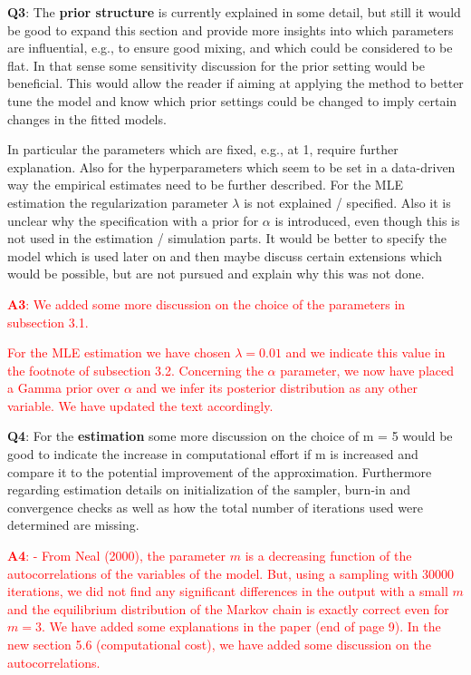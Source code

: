 \documentclass[]{article}
\newcommand\done[1]{\textcolor{red}{#1}}
\begin{document}
	
	\vspace{3mm}
	\textbf{Q3}:
	The \textbf{prior structure} is currently explained in some detail, but still it would be good to expand this section and provide more insights into which parameters are influential, e.g., to ensure good mixing, and which could be considered to be flat. In that sense some sensitivity discussion for the prior setting would be beneficial. This would allow the reader if aiming at applying the method to better tune the model and know which prior settings could be changed to imply certain changes in the fitted models.
	
	In particular the parameters which are fixed, e.g., at 1, require further explanation. Also for the hyperparameters which seem to be set in a data-driven way the empirical estimates need to be further described. For the MLE estimation the regularization parameter $\lambda$ is not explained / specified. Also it is unclear why the specification with a prior for $\alpha$ is introduced, even though this is not used in the estimation / simulation parts. It would be better to specify the model which is used later on and then maybe discuss certain extensions which would be possible, but are not pursued and explain why this was not done.
	
	\textcolor{red}{
		\textbf{A3}: We added some more discussion on the choice of the parameters in subsection 3.1.
	}
	
	\done{For the MLE estimation we have chosen $\lambda = 0.01$ and we indicate this value in the footnote of subsection 3.2. Concerning the $\alpha$ parameter, we now have placed a Gamma prior over $\alpha$ and we infer its posterior distribution as any other variable. We have updated the text accordingly.}
	
	\vspace{3mm}
	\textbf{Q4}:
	For the \textbf{estimation} some more discussion on the choice of m = 5 would be good to indicate the increase in computational effort if m is increased and compare it to the potential improvement of the approximation. Furthermore regarding estimation details on initialization of the sampler, burn-in and convergence checks as well as how the total number of iterations used were determined are missing.
	
	\textcolor{red}{
		\textbf{A4}: 
		- From Neal (2000), the parameter $m$ is a decreasing function of the autocorrelations of the variables of the model. But, using a sampling with 30000 iterations, we did not find any significant differences in the output with a small $m$ and the equilibrium distribution of the Markov chain is exactly correct even for $m=3$. We have added some explanations in the paper (end of page 9). In the new section 5.6 (computational cost), we have added some discussion on the autocorrelations.}
	
\end{document}
